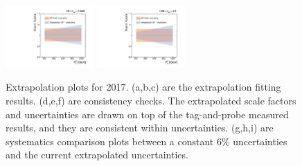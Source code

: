 \begin{figure}[!htbp]
  \includegraphics[width=0.3\textwidth]{fig/Extrapolate_2017_1_Compare.pdf}
  \includegraphics[width=0.3\textwidth]{fig/Extrapolate_2017_2_Compare.pdf}
  \caption{Extrapolation plots for 2017. (a,b,c) are the extrapolation fitting results. (d,e,f) are consistency checks. The extrapolated scale factors and uncertainties are drawn on top of the tag-and-probe measured results, and they are consistent within uncertainties. (g,h,i) are systematics comparison plots between a constant 6\% uncertainties and the current extrapolated uncertainties.}
  \label{fig:Extrapolation2017}
\end{figure}

